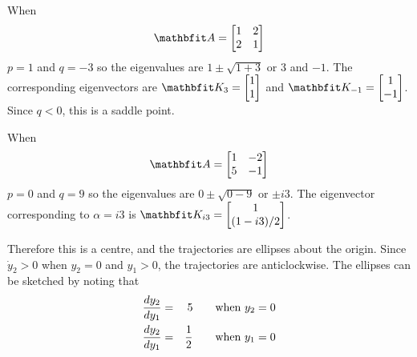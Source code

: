 \begin{example}
When 
$$\vect{A}=\begin{bmatrix} 1 & 2 \\ 2 & 1 \end{bmatrix}$$ 
$p=1$ and $q=-3$ so
the eigenvalues are $1\pm\sqrt{1+3}$ or $3$ and $-1$.  The corresponding
eigenvectors are $\vect{K}_{3}=\begin{bmatrix} 1 \\ 1 \end{bmatrix}$ and
$\vect{K}_{-1}=\begin{bmatrix} 1 \\ -1 \end{bmatrix}$.  
Since $q<0$, this is a saddle point.

\begin{center}
\end{center}
\end{example}

\begin{example}
When $$\vect{A}=\begin{bmatrix}1 & -2 \\ 5 & -1 \end{bmatrix}$$
$p=0$ and $q=9$ so
the eigenvalues are $0\pm\sqrt{0-9}$ or $\pm i3$.  The eigenvector 
corresponding to $\alpha=i3$ is $\vect{K}_{i3}=\begin{bmatrix} 1 \\
(1-i3)/2 \end{bmatrix}$.

Therefore this is a centre, and the trajectories are ellipses about the
origin.  Since $\dot{y}_2>0$ when $y_2=0$ and $y_1>0$, the trajectories are
anticlockwise.  The ellipses can be sketched by noting that
\begin{eqnarray*}
\frac{dy_2}{dy_1}&=&5\qquad\mbox{when $y_2=0$}\\
\frac{dy_2}{dy_1}&=&\frac{1}{2}\qquad\mbox{when $y_1=0$}
\end{eqnarray*}

\begin{center}
\end{center}
\end{example}

